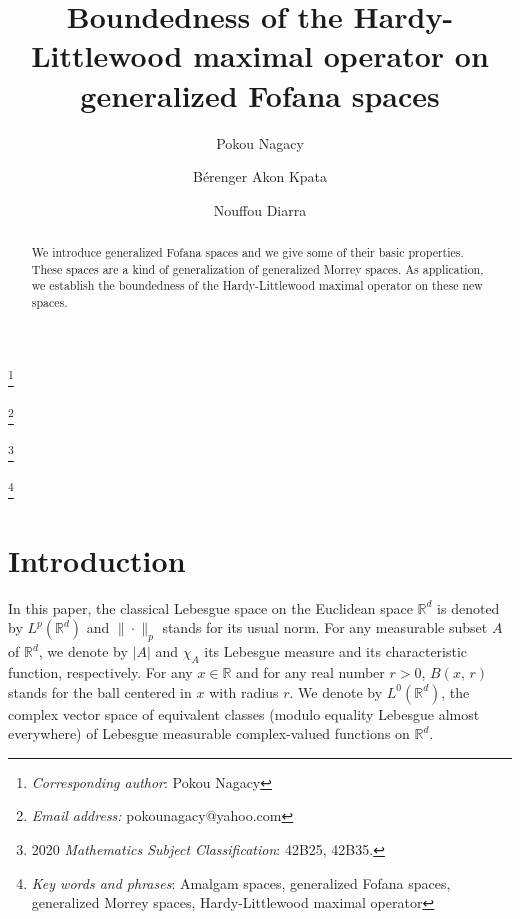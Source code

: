 \documentclass[a4paper,12pt,intlimits,oneside]{amsart}
\numberwithin{equation}{section}
\numberwithin{equation}{section}
\theoremstyle{definition}
\begin{document}
\title []{Boundedness of the Hardy-Littlewood maximal operator on generalized Fofana spaces}

\author[P. Nagacy]{Pokou Nagacy}
\address{Laboratoire des Sciences et Technologies de l'Environnement, UFR Environnement, Universit\'e Jean Lorougnon
GUEDE, BP 150 Daloa, C\^ote d'Ivoire}

\author[B. A. Kpata]{B\'erenger Akon Kpata}
\address{Laboratoire de Math\'ematiques et Informatique, UFR Sciences Fondamentales et
Appliquées,
 Université Nangui Abrogoua,
 02 BP 801 Abidjan 02,  C\^ote d'Ivoire}
\author[N. Diarra]{Nouffou Diarra}
\address{Laboratoire de Math\'ematiques et Applications, UFR Math\'ematiques et Informatique,
 Universit\'e F\'elix
 Houphou\"et-Boigny,
 22 BP 582 Abidjan 22,  C\^ote d'Ivoire}




 \renewcommand{\thefootnote}{}
\footnote{\emph{Corresponding author}: Pokou Nagacy}

\footnote{\emph{Email address:} pokounagacy@yahoo.com}

\footnote{2020 \emph{Mathematics Subject Classification}: 42B25, 42B35.}

\footnote{\emph{Key words and phrases}: Amalgam spaces, generalized Fofana spaces, generalized Morrey spaces, Hardy-Littlewood maximal operator}

\renewcommand{\thefootnote}{\arabic{footnote}}
\setcounter{footnote}{0}

\begin{abstract}
We introduce generalized Fofana spaces and we give some of their basic properties. These spaces are a kind of generalization of generalized Morrey spaces. As application, we establish the boundedness of the Hardy-Littlewood maximal operator on these new spaces.
\end{abstract}

\maketitle


\section{Introduction}
In this paper, the classical Lebesgue space on the Euclidean space $\mathbb{R}^{d}$ is denoted by $L^{p}(\mathbb{R}^{d})$ and $\|\cdot \|_{p} $ stands for its usual norm. For any measurable subset $A$ of $\mathbb{R}^{d}$, we denote by $\vert A \vert$ and $\chi_{A}$ its Lebesgue measure and its characteristic function, respectively. For any $x \in \mathbb{R}$ and for any real number $r>0$, $B(x,\, r)$ stands for the ball centered in $x$ with radius $r$. We denote by $ L^{0}(\mathbb{R}^{d}) $, the complex vector space of equivalent classes (modulo equality Lebesgue almost everywhere) of Lebesgue measurable complex-valued functions on $ \mathbb{R}^{d}$.
\end{document}
